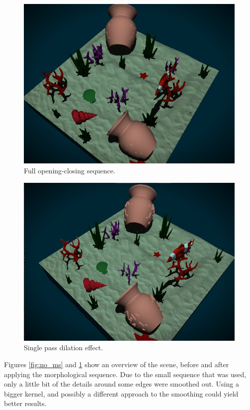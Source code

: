 \documentclass{article}
\begin{document}
\begin{figure}[h]
    \centering
    \includegraphics[width=\columnwidth]{imgs/opening_closing.jpg}
    \caption{Full opening-closing sequence.}
    \label{fig:opening_closing_ms}
\end{figure}

\begin{figure}[h]
    \centering
    \includegraphics[width=\columnwidth]{imgs/dilation.jpg}
    \caption{Single pass dilation effect.}
    \label{fig:dilation_ms}
\end{figure}

\newpage
\noindent
Figures \ref{fig:no_ms} and \ref{fig:opening_closing_ms} show an overview of the scene, before and after 
applying the morphological sequence. Due to the small sequence that was used, only a little bit of the 
details around some edges were smoothed out. Using a bigger kernel, and possibly a different approach to 
the smoothing could yield better results. 
\end{document}
